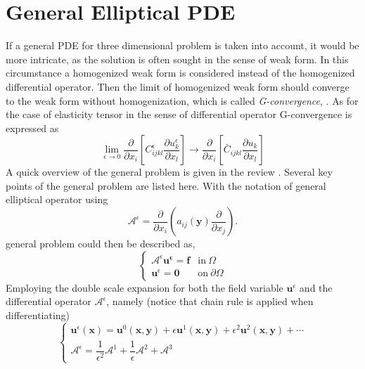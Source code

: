 \section{General Elliptical PDE}
If a general PDE for three dimensional problem is taken into account, it would be more intricate, as the solution is often sought in the sense of weak form. In this circumstance a homogenized weak form is considered instead of the homogenized differential operator. Then the limit of homogenized weak form should converge to the weak form without homogenization, which is called \textit{G-convergence}, \citep{hollister1992comparison}. As for the case of elasticity tensor in the sense of differential operator G-convergence is expressed as
\begin{equation}
\label{eq: G conv}
\lim_{\epsilon \to 0} \dfrac{\partial}{\partial x_{i}} \left[ C^{\epsilon}_{ijkl} \dfrac{\partial u^{\epsilon}_{k}}{\partial x_{l}} \right] \rightarrow \dfrac{\partial}{\partial x_{i}} \left[ \bar{C}_{ijkl} \dfrac{\partial u_{k}}{\partial x_{l}} \right]
\end{equation}
A quick overview of the general problem is given in the review \citep{hassani1998review}. Several key points of the general problem are listed here. With the notation of general elliptical operator using 
\begin{equation}
\mathcal{A}^{\epsilon} = \dfrac{\partial}{\partial x_{i}} \left( a_{ij}(\mathbf{y}) \dfrac{\partial}{\partial x_{j}} \right).
\end{equation}
general problem could then be described as,
\begin{equation}
\left\{
\begin{array}{ll}
\mathcal{A}^{\epsilon} \mathbf{u^{\epsilon}}= \mathbf{f} & \text{in} \ \Omega \\
\mathbf{u}^{\epsilon} = \mathbf{0} & \text{on} \ \partial \Omega
\end{array}
\right.
\end{equation}
Employing the double scale expansion for both the field variable $\mathbf{u}^{\epsilon}$ and the differential operator $\mathcal{A}^{\epsilon}$, namely (notice that chain rule is applied when differentiating)
\begin{equation}
\left\{
\begin{array}{l}
\mathbf{u}^{\epsilon}(\mathbf{x}) = \mathbf{u}^{0}(\mathbf{x},\mathbf{y}) + \epsilon \mathbf{u}^{1}(\mathbf{x},\mathbf{y}) + \epsilon^{2} \mathbf{u}^{2}(\mathbf{x},\mathbf{y}) + \cdots \\
\mathcal{A}^{\epsilon} = \dfrac{1}{\epsilon^{2}} \mathcal{A}^{1} + \dfrac{1}{\epsilon} \mathcal{A}^{2} + \mathcal{A}^{3}
\end{array}
\right.
\end{equation}
